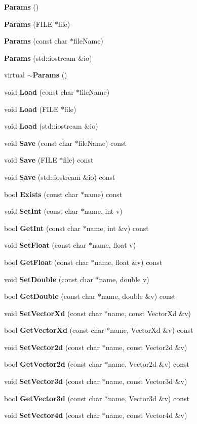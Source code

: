 \begin{DoxyCompactItemize}
\item 
{\bf \-Params} ()
\item 
{\bf \-Params} (\-F\-I\-L\-E $\ast$file)
\item 
{\bf \-Params} (const char $\ast$file\-Name)
\item 
{\bf \-Params} (std\-::iostream \&io)
\item 
virtual {\bf $\sim$\-Params} ()
\item 
void {\bf \-Load} (const char $\ast$file\-Name)
\item 
void {\bf \-Load} (\-F\-I\-L\-E $\ast$file)
\item 
void {\bf \-Load} (std\-::iostream \&io)
\item 
void {\bf \-Save} (const char $\ast$file\-Name) const 
\item 
void {\bf \-Save} (\-F\-I\-L\-E $\ast$file) const 
\item 
void {\bf \-Save} (std\-::iostream \&io) const 
\item 
bool {\bf \-Exists} (const char $\ast$name) const 
\item 
void {\bf \-Set\-Int} (const char $\ast$name, int v)
\item 
bool {\bf \-Get\-Int} (const char $\ast$name, int \&v) const 
\item 
void {\bf \-Set\-Float} (const char $\ast$name, float v)
\item 
bool {\bf \-Get\-Float} (const char $\ast$name, float \&v) const 
\item 
void {\bf \-Set\-Double} (const char $\ast$name, double v)
\item 
bool {\bf \-Get\-Double} (const char $\ast$name, double \&v) const 
\item 
void {\bf \-Set\-Vector\-Xd} (const char $\ast$name, const \-Vector\-Xd \&v)
\item 
bool {\bf \-Get\-Vector\-Xd} (const char $\ast$name, \-Vector\-Xd \&v) const 
\item 
void {\bf \-Set\-Vector2d} (const char $\ast$name, const \-Vector2d \&v)
\item 
bool {\bf \-Get\-Vector2d} (const char $\ast$name, \-Vector2d \&v) const 
\item 
void {\bf \-Set\-Vector3d} (const char $\ast$name, const \-Vector3d \&v)
\item 
bool {\bf \-Get\-Vector3d} (const char $\ast$name, \-Vector3d \&v) const 
\item 
void {\bf \-Set\-Vector4d} (const char $\ast$name, const \-Vector4d \&v)

\end{DoxyCompactItemize}
